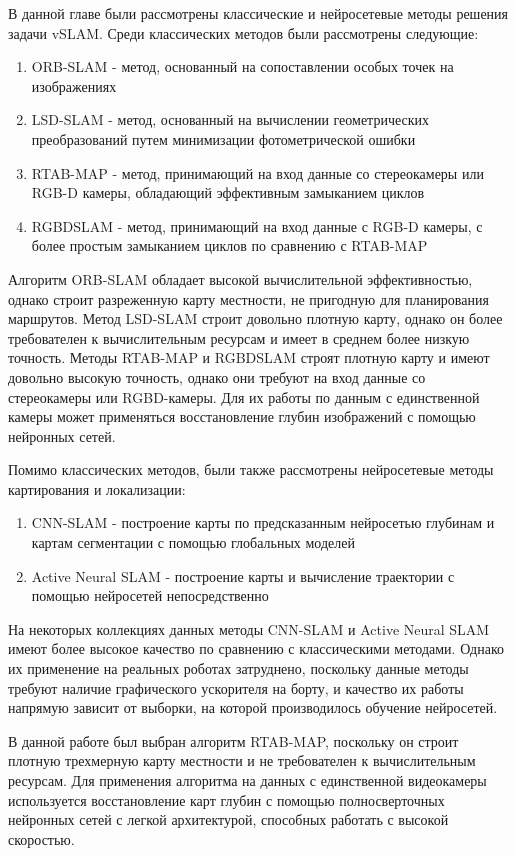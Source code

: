 \documentclass{mipt-thesis-ms}
\begin{document}
	В данной главе были рассмотрены классические и нейросетевые методы решения задачи vSLAM. Среди классических методов были рассмотрены следующие:
	
	\begin{enumerate}
		\item ORB-SLAM - метод, основанный на сопоставлении особых точек на изображениях
		\item LSD-SLAM - метод, основанный на вычислении геометрических преобразований путем минимизации фотометрической ошибки
		\item RTAB-MAP - метод, принимающий на вход данные со стереокамеры или RGB-D камеры, обладающий эффективным замыканием циклов
		\item RGBDSLAM - метод, принимающий на вход данные с RGB-D камеры, с более простым замыканием циклов по сравнению с RTAB-MAP
	\end{enumerate}

	Алгоритм ORB-SLAM обладает высокой вычислительной эффективностью, однако строит разреженную карту местности, не пригодную для планирования маршрутов. Метод LSD-SLAM строит довольно плотную карту, однако он более требователен к вычислительным ресурсам и имеет в среднем более низкую точность. Методы RTAB-MAP и RGBDSLAM строят плотную карту и имеют довольно высокую точность, однако они требуют на вход данные со стереокамеры или RGBD-камеры. Для их работы по данным с единственной камеры может применяться восстановление глубин изображений с помощью нейронных сетей.
	
	Помимо классических методов, были также рассмотрены нейросетевые методы картирования и локализации:
	
	\begin{enumerate}
		\item CNN-SLAM - построение карты по предсказанным нейросетью глубинам и картам сегментации с помощью глобальных моделей
		\item Active Neural SLAM - построение карты и вычисление траектории с помощью нейросетей непосредственно
	\end{enumerate}

	На некоторых коллекциях данных методы CNN-SLAM и Active Neural SLAM имеют более высокое качество по сравнению с классическими методами. Однако их применение на реальных роботах затруднено, поскольку данные методы требуют наличие графического ускорителя на борту, и качество их работы напрямую зависит от выборки, на которой производилось обучение нейросетей.
	
	В данной работе был выбран алгоритм RTAB-MAP, поскольку он строит плотную трехмерную карту местности и не требователен к вычислительным ресурсам. Для применения алгоритма на данных с единственной видеокамеры используется восстановление карт глубин с помощью полносверточных нейронных сетей с легкой архитектурой, способных работать с высокой скоростью.
		
\end{document}
